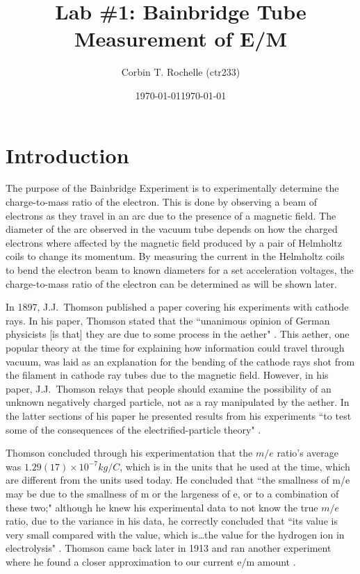 \documentclass[aps,prl,10pt,twocolumn,floatfix]{revtex4-2}
\begin{document}
\begin{abstract}
\end{abstract}


\title{Lab \#1: Bainbridge Tube Measurement of E/M}
\author{Corbin T. Rochelle (ctr233)}
\date{\today}
\date{\today}

\maketitle

\section{Introduction}\label{Intro}

The purpose of the Bainbridge Experiment is to experimentally determine the charge-to-mass ratio of the electron.
This is done by observing a beam of electrons as they travel in an arc due to the presence of a magnetic field\cite{WingerBain}.
The diameter of the arc observed in the vacuum tube depends on how the charged electrons where affected by the magnetic field produced by a pair of Helmholtz coils to change its momentum.
By measuring the current in the Helmholtz coils to bend the electron beam to known diameters for a set acceleration voltages, the charge-to-mass ratio of the electron can be determined as will be shown later.

In 1897, J.J.~Thomson published a paper covering his experiments with cathode rays.
In his paper, Thomson stated that the ``unanimous opinion of German physicists [is that] they are due to some process in the aether" \cite{CathodeRays}.
This aether, one popular theory at the time for explaining how information could travel through vacuum, was laid as an explanation for the bending of the cathode rays shot from the filament in cathode ray tubes due to the magnetic field.
However, in his paper, J.J.~Thomson relays that people should examine the possibility of an unknown negatively charged particle, not as a ray manipulated by the aether.
In the latter sections of his paper he presented results from his experiments ``to test some of the consequences of the electrified-particle theory" \cite{CathodeRays}.

Thomson concluded through his experimentation that the $m/e$ ratio's average was  $1.29(17)\!\times\!10^{-7} kg/C$, which is in the units that he used at the time, which are different from the units used today.
He concluded that ``the smallness of m/e may be due to the smallness of m or the largeness of e, or to a combination
of these two;"
although he knew his experimental data to not know the true $m/e$ ratio, due to the variance in his data, he correctly concluded that ``its value is very small compared with the value, which is\ldots the value for the hydrogen ion in electrolysis" \cite{CathodeRays}.
Thomson came back later in 1913 and ran another experiment where he found a closer approximation to our current e/m amount \cite{Wiki}.
\end{document}
